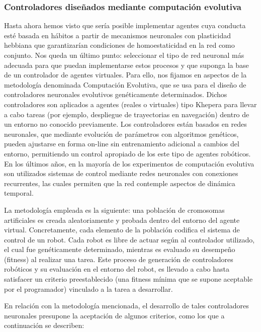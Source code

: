 \subsubsection{Controladores diseñados mediante computación evolutiva}
Hasta ahora hemos visto que sería posible implementar agentes cuya conducta esté basada en hábitos a partir de mecanismos neuronales con plasticidad hebbiana que garantizarían condiciones de homoestaticidad en la red como conjunto. Nos queda un último punto: seleccionar el tipo de red neuronal más adecuada para que puedan implementarse estos procesos y que suponga la base de un controlador de agentes virtuales. Para ello, nos fijamos en aspectos de la metodología denominada Computación Evolutiva, que se usa para el diseño de controladores neuronales evolutivos genéticamente determinados. Dichos controladores son aplicados a agentes (reales o virtuales) tipo Khepera para llevar a cabo tareas (por ejemplo, despliegue de trayectorias en navegación) dentro de un entorno no conocido previamente. Los controladores están basados en redes neuronales, que mediante evolución de parámetros con algoritmos genéticos, pueden ajustarse en forma on-line sin entrenamiento adicional a cambios del entorno, permitiendo un control apropiado de los este tipo de agentes robóticos. En los últimos años, en la mayoría de los experimentos de computación evolutiva son utilizados sistemas de control mediante redes neuronales con conexiones recurrentes, las cuales permiten que la red contemple aspectos de dinámica temporal\cite{JesperDario}.

La metodología empleada es la siguiente: una población de cromosomas artificiales es creada aleatoriamente y probada dentro del entorno del agente virtual. Concretamente, cada elemento de la población codifica el sistema de control de un robot. Cada robot es libre de actuar según al controlador utilizado, el cual fue genéticamente determinado, mientras es evaluado su desempeño (fitness) al realizar una tarea. Este proceso de generación de controladores robóticos y su evaluación en el entorno del robot, es llevado a cabo hasta satisfacer un criterio preestablecido (una fitness mínima que se supone aceptable por el programador) vinculado a la tarea a desarrollar.

En relación con la metodología mencionada, el desarrollo de tales controladores neuronales presupone la aceptación de algunos criterios, como los que a continuación se describen:

